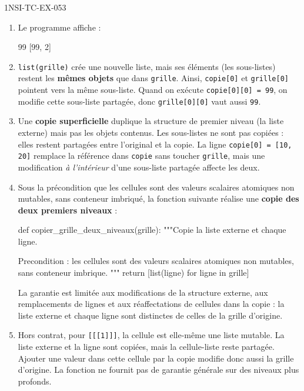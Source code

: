 \begin{corrige}{1NSI-TC-EX-053}
\begin{enumerate}
  \item Le programme affiche :
\begin{console}
99
[99, 2]
\end{console}

  \item \lstinline{list(grille)} crée une nouvelle liste, mais ses éléments (les sous-listes) restent les \textbf{mêmes objets} que dans \lstinline{grille}. Ainsi, \lstinline{copie[0]} et \lstinline{grille[0]} pointent vers la même sous-liste. Quand on exécute \lstinline{copie[0][0] = 99}, on modifie cette sous-liste partagée, donc \lstinline{grille[0][0]} vaut aussi \lstinline{99}.

  \item Une \textbf{copie superficielle} duplique la structure de premier niveau (la liste externe) mais pas les objets contenus. Les sous-listes ne sont pas copiées : elles restent partagées entre l'original et la copie. La ligne \lstinline{copie[0] = [10, 20]} remplace la référence dans \lstinline{copie} sans toucher \lstinline{grille}, mais une modification \emph{à l'intérieur} d'une sous-liste partagée affecte les deux.

  \item Sous la précondition que les cellules sont des valeurs scalaires atomiques
        non mutables, sans conteneur imbriqué, la fonction suivante réalise une
        \textbf{copie des deux premiers niveaux} :
\begin{python}
def copier_grille_deux_niveaux(grille):
    """Copie la liste externe et chaque ligne.

    Precondition : les cellules sont des valeurs scalaires atomiques non mutables,
    sans conteneur imbrique.
    """
    return [list(ligne) for ligne in grille]
\end{python}
La garantie est limitée aux modifications de la structure externe, aux
remplacements de lignes et aux réaffectations de cellules dans la copie : la
liste externe et chaque ligne sont distinctes de celles de la grille d'origine.

  \item Hors contrat, pour \lstinline{[[[1]]]}, la cellule est elle-même une liste
        mutable. La liste externe et la ligne sont copiées, mais la cellule-liste
        reste partagée. Ajouter une valeur dans cette cellule par la copie modifie
        donc aussi la grille d'origine. La fonction ne fournit pas de garantie
        générale sur des niveaux plus profonds.
\end{enumerate}
\end{corrige}

